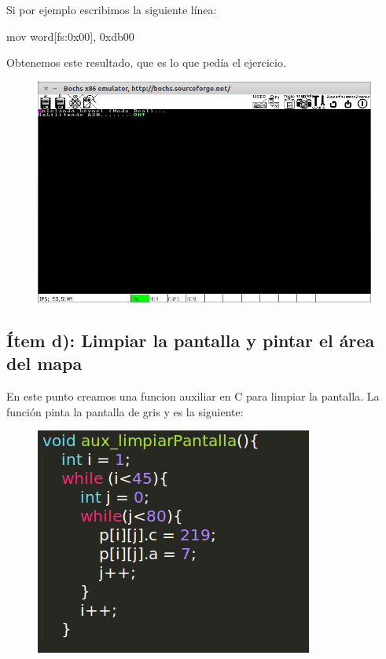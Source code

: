 Si por ejemplo escribimos la siguiente línea:
\begin{center}
mov word[fs:0x00],  0xdb00
\end{center}

Obtenemos este resultado, que es lo que pedía el ejercicio.

\begin{figure}[H]
\begin{center}
  \includegraphics[width=\linewidth]{ejercicio1/esqsupizq.png}
  \caption{{\small}} 
\endminipage
\end{center}
\end{figure}

\subsection{Ítem d): Limpiar la pantalla y pintar el área del mapa}

En este punto creamos una funcion auxiliar en C para limpiar la pantalla. La función pinta la pantalla de gris y es la siguiente:

\begin{figure}[H]
\begin{center}
  \includegraphics[width=\linewidth]{ejercicio1/limpant.png}
  \caption{{\small}} 
\endminipage
\end{center}
\end{figure}


